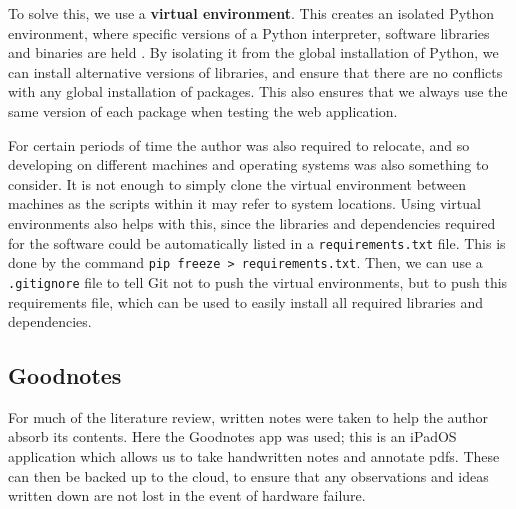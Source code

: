 To solve this, we use a \textbf{virtual environment}. This creates an isolated Python environment, where specific versions of a Python interpreter, software libraries and binaries are held \cite{venv}. By isolating it from the global installation of Python, we can install alternative versions of libraries, and ensure that there are no conflicts with any global installation of packages. This also ensures that we always use the same version of each package when testing the web application.

For certain periods of time the author was also required to relocate, and so developing on different machines and operating systems was also something to consider. It is not enough to simply clone the virtual environment between machines as the scripts within it may refer to system locations. Using virtual environments also helps with this, since the libraries and dependencies required for the software could be automatically listed in a \texttt{requirements.txt} file. This is done by the command \texttt{pip~freeze~>~requirements.txt}. Then, we can use a \texttt{.gitignore} file to tell Git not to push the virtual environments, but to push this requirements file, which can be used to easily install all required libraries and dependencies.

\subsection{Goodnotes}
For much of the literature review, written notes were taken to help the author absorb its contents. Here the Goodnotes app was used; this is an iPadOS application which allows us to take handwritten notes and annotate pdfs. These can then be backed up to the cloud, to ensure that any observations and ideas written down are not lost in the event of hardware failure.